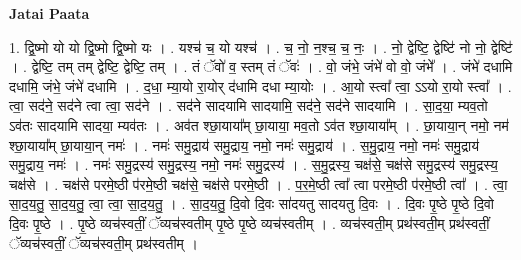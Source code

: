 \documentclass[17pt]{extarticle}
\begin{document}
\textbf{Jatai Paata} \newline

1. द्वि॒ष्मो यो यो द्वि॒ष्मो द्वि॒ष्मो यः । . यश्च॑ च॒ यो यश्च॑ । . च॒ नो॒ न॒श्च॒ च॒ नः॒ । . नो॒ द्वेष्टि॒ द्वेष्टि॑ नो नो॒ द्वेष्टि॑ । . द्वेष्टि॒ तम् तम् द्वेष्टि॒ द्वेष्टि॒ तम् । . तं ॅवो॑ व॒ स्तम् तं ॅवः॑ । . वो॒ जंभे॒ जंभे॑ वो वो॒ जंभे᳚ । . जंभे॑ दधामि दधामि॒ जंभे॒ जंभे॑ दधामि । . द॒धा॒ म्या॒यो रा॒योर् द॑धामि दधा म्या॒योः । . आ॒यो स्त्वा᳚ त्वा॒ ऽऽयो रा॒यो स्त्वा᳚ । . त्वा॒ सद॑ने॒ सद॑ने त्वा त्वा॒ सद॑ने । . सद॑ने सादयामि सादयामि॒ सद॑ने॒ सद॑ने सादयामि । . सा॒द॒या॒ म्यव॒तो ऽव॑तः सादयामि सादया॒ म्यव॑तः । . अव॑त श्छा॒याया᳚म् छा॒याया॒ मव॒तो ऽव॑त श्छा॒याया᳚म् । . छा॒याया॒न् नमो॒ नम॑ श्छा॒याया᳚म् छा॒याया॒न् नमः॑ । . नमः॑ समु॒द्राय॑ समु॒द्राय॒ नमो॒ नमः॑ समु॒द्राय॑ । . स॒मु॒द्राय॒ नमो॒ नमः॑ समु॒द्राय॑ समु॒द्राय॒ नमः॑ । . नमः॑ समु॒द्रस्य॑ समु॒द्रस्य॒ नमो॒ नमः॑ समु॒द्रस्य॑ । . स॒मु॒द्रस्य॒ चक्ष॑से॒ चक्ष॑से समु॒द्रस्य॑ समु॒द्रस्य॒ चक्ष॑से । . चक्ष॑से परमे॒ष्ठी प॑रमे॒ष्ठी चक्ष॑से॒ चक्ष॑से परमे॒ष्ठी । . प॒र॒मे॒ष्ठी त्वा᳚ त्वा परमे॒ष्ठी प॑रमे॒ष्ठी त्वा᳚ । . त्वा॒ सा॒द॒य॒तु॒ सा॒द॒य॒तु॒ त्वा॒ त्वा॒ सा॒द॒य॒तु॒ । . सा॒द॒य॒तु॒ दि॒वो दि॒वः सा॑दयतु सादयतु दि॒वः । . दि॒वः पृ॒ष्ठे पृ॒ष्ठे दि॒वो दि॒वः पृ॒ष्ठे । . पृ॒ष्ठे व्यच॑स्वतीं॒ ॅव्यच॑स्वतीम् पृ॒ष्ठे पृ॒ष्ठे व्यच॑स्वतीम् । . व्यच॑स्वती॒म् प्रथ॑स्वती॒म् प्रथ॑स्वतीं॒ ॅव्यच॑स्वतीं॒ ॅव्यच॑स्वती॒म् प्रथ॑स्वतीम् । \newline
\end{document}
